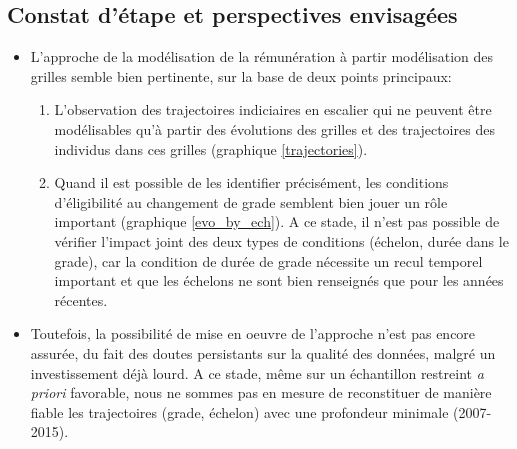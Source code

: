 \documentclass[11pt,a4paper]{article}
\begin{document}
\subsection*{Constat d'étape et perspectives envisagées}


\begin{itemize}
\item L'approche de la modélisation de la rémunération à partir modélisation des grilles semble bien pertinente, sur la base de deux points principaux:
\begin{enumerate}
\item L'observation des trajectoires indiciaires \og en escalier \fg{} qui ne peuvent être modélisables qu'à partir des évolutions des grilles et des trajectoires des individus dans ces grilles (graphique \ref{trajectories}).
\item Quand il est possible de les identifier précisément, les conditions d'éligibilité au changement de grade semblent bien jouer un rôle important (graphique \ref{evo_by_ech}). A ce stade, il n'est pas possible de vérifier l'impact joint des deux types de conditions (échelon, durée dans le grade), car la condition de durée de grade nécessite un recul temporel important et que les échelons ne sont bien renseignés que pour les années récentes. 
\end{enumerate}
\item Toutefois, la possibilité de mise en oeuvre de l'approche n'est pas encore assurée, du fait des doutes persistants sur la qualité des données, malgré un investissement déjà lourd. A ce stade, même sur un échantillon restreint \textit{a priori} favorable, nous ne sommes pas en mesure de reconstituer de manière fiable les trajectoires (grade, échelon) avec une profondeur minimale (2007-2015). 


\end{itemize}
\end{document}
